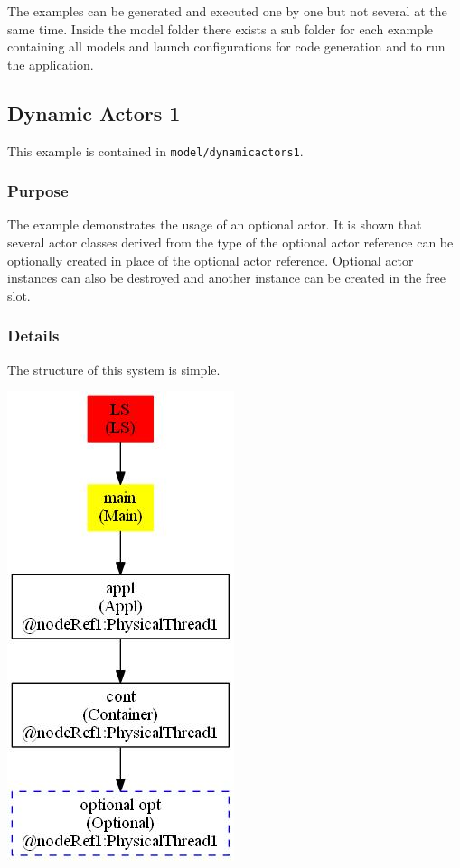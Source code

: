 The examples can be generated and executed one by one but not several at the same
time. Inside the model folder there exists a sub folder for each example
containing all models and launch configurations for code generation and to
run the application.

\subsection{Dynamic Actors 1}

This example is contained in \texttt{model/dynamicactors1}.

\subsubsection{Purpose}

The example demonstrates the usage of an optional actor. It is shown that several actor classes
derived from the type of the optional actor reference can be optionally created in place
of the optional actor reference. Optional actor instances can also be destroyed
and another instance can be created in the free slot.

\subsubsection{Details}

The structure of this system is simple.

\includegraphics[scale=0.7]{images/039-DynAct1-Main_instanceTree.jpg}

